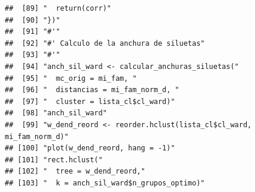\documentclass[11pt,]{article}
\begin{document}
\begin{verbatim}
##  [89] "  return(corr)"                                                                                                                                                        
##  [90] "})"                                                                                                                                                                    
##  [91] "#'"                                                                                                                                                                    
##  [92] "#' Calculo de la anchura de siluetas"                                                                                                                                  
##  [93] "#'"                                                                                                                                                                    
##  [94] "anch_sil_ward <- calcular_anchuras_siluetas("                                                                                                                          
##  [95] "  mc_orig = mi_fam, "                                                                                                                                                  
##  [96] "  distancias = mi_fam_norm_d, "                                                                                                                                        
##  [97] "  cluster = lista_cl$cl_ward)"                                                                                                                                         
##  [98] "anch_sil_ward"                                                                                                                                                         
##  [99] "w_dend_reord <- reorder.hclust(lista_cl$cl_ward, mi_fam_norm_d)"                                                                                                       
## [100] "plot(w_dend_reord, hang = -1)"                                                                                                                                         
## [101] "rect.hclust("                                                                                                                                                          
## [102] "  tree = w_dend_reord,"                                                                                                                                                
## [103] "  k = anch_sil_ward$n_grupos_optimo)"                                                                                                                                  

\end{verbatim}
\end{document}
